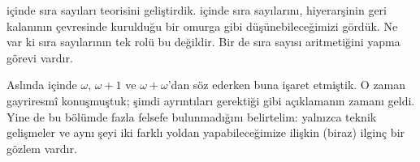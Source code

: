 


 içinde sıra sayıları teorisini geliştirdik.
 içinde sıra sayılarını, hiyerarşinin geri kalanının
çevresinde kurulduğu bir omurga gibi düşünebileceğimizi gördük. Ne var ki
sıra sayılarının tek rolü bu değildir. Bir de sıra sayısı aritmetiğini
yapma görevi vardır.

Aslında  içinde $\omega$, $\omega+1$ ve
$\omega+\omega$'dan söz ederken buna işaret etmiştik. O zaman gayriresmî
konuşmuştuk; şimdi ayrıntıları gerektiği gibi açıklamanın zamanı geldi. Yine
de bu bölümde fazla felsefe bulunmadığını belirtelim: yalnızca teknik
gelişmeler ve aynı şeyi iki farklı yoldan yapabileceğimize ilişkin (biraz)
ilginç bir gözlem vardır.

